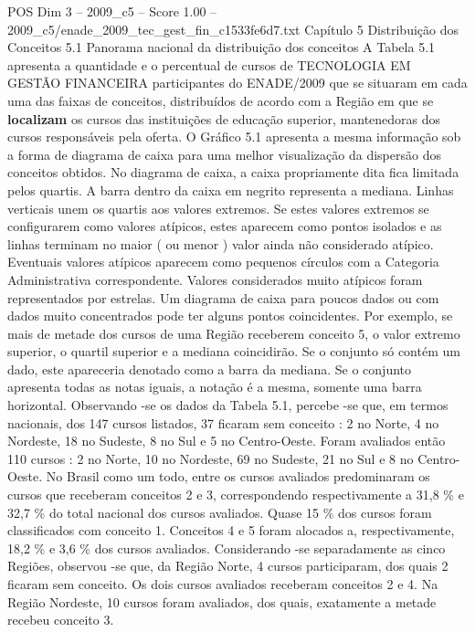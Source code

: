 \begin{textsample}{POS Dim 3 – 2009\_c5 – Score 1.00 – 2009\_c5/enade\_2009\_tec\_gest\_fin\_c1533fe6d7.txt}  \label{ex:f3_pos_131}
Capítulo 5 Distribuição dos Conceitos 5.1 Panorama nacional da distribuição dos conceitos A Tabela 5.1 apresenta a quantidade e o percentual de cursos de TECNOLOGIA EM GESTÃO FINANCEIRA participantes do ENADE/2009 que se situaram em cada uma das faixas de conceitos, distribuídos de acordo com a Região em que se \textbf{localizam} os cursos das instituições de educação superior, mantenedoras dos cursos responsáveis pela oferta.
O Gráfico 5.1 apresenta a mesma informação sob a forma de diagrama de caixa para uma melhor visualização da dispersão dos conceitos obtidos.
No diagrama de caixa, a caixa propriamente dita fica limitada pelos quartis.
A barra dentro da caixa em negrito representa a mediana.
Linhas verticais unem os quartis aos valores extremos.
Se estes valores extremos se configurarem como valores atípicos, estes aparecem como pontos isolados e as linhas terminam no maior ( ou menor ) valor ainda não considerado atípico.
Eventuais valores atípicos aparecem como pequenos círculos com a Categoria Administrativa correspondente.
Valores considerados muito atípicos foram representados por estrelas.
Um diagrama de caixa para poucos dados ou com dados muito concentrados pode ter alguns pontos coincidentes.
Por exemplo, se mais de metade dos cursos de uma Região receberem conceito 5, o valor extremo superior, o quartil superior e a mediana coincidirão.
Se o conjunto só contém um dado, este apareceria denotado como a barra da mediana.
Se o conjunto apresenta todas as notas iguais, a notação é a mesma, somente uma barra horizontal.
Observando -se os dados da Tabela 5.1, percebe -se que, em termos nacionais, dos 147 cursos listados, 37 ficaram sem conceito : 2 no Norte, 4 no Nordeste, 18 no Sudeste, 8 no Sul e 5 no Centro-Oeste.
Foram avaliados então 110 cursos : 2 no Norte, 10 no Nordeste, 69 no Sudeste, 21 no Sul e 8 no Centro-Oeste.
No Brasil como um todo, entre os cursos avaliados predominaram os cursos que receberam conceitos 2 e 3, correspondendo respectivamente a 31,8 \% e 32,7 \% do total nacional dos cursos avaliados.
Quase 15 \% dos cursos foram classificados com conceito 1.
Conceitos 4 e 5 foram alocados a, respectivamente, 18,2 \% e 3,6 \% dos cursos avaliados.
Considerando -se separadamente as cinco Regiões, observou -se que, da Região Norte, 4 cursos participaram, dos quais 2 ficaram sem conceito.
Os dois cursos avaliados receberam conceitos 2 e 4.
Na Região Nordeste, 10 cursos foram avaliados, dos quais, exatamente a metade recebeu conceito 3.

\end{textsample}
